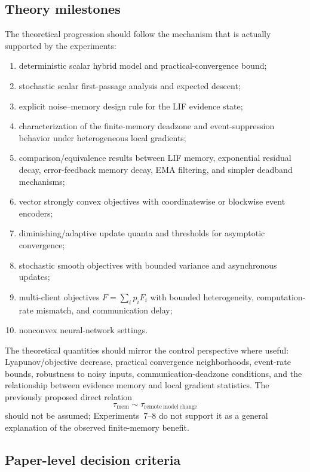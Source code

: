 \subsection{Theory milestones}

The theoretical progression should follow the mechanism that is actually supported by the experiments:
\begin{enumerate}
  \item deterministic scalar hybrid model and practical-convergence bound;
  \item stochastic scalar first-passage analysis and expected descent;
  \item explicit noise--memory design rule for the LIF evidence state;
  \item characterization of the finite-memory deadzone and event-suppression behavior under heterogeneous local gradients;
  \item comparison/equivalence results between LIF memory, exponential residual decay, error-feedback memory decay, EMA filtering, and simpler deadband mechanisms;
  \item vector strongly convex objectives with coordinatewise or blockwise event encoders;
  \item diminishing/adaptive update quanta and thresholds for asymptotic convergence;
  \item stochastic smooth objectives with bounded variance and asynchronous updates;
  \item multi-client objectives $F=\sum_i p_iF_i$ with bounded heterogeneity, computation-rate mismatch, and communication delay;
  \item nonconvex neural-network settings.
\end{enumerate}

The theoretical quantities should mirror the control perspective where useful: Lyapunov/objective decrease, practical convergence neighborhoods, event-rate bounds, robustness to noisy inputs, communication-deadzone conditions, and the relationship between evidence memory and local gradient statistics. The previously proposed direct relation
\begin{equation}
  \tau_{\mathrm{mem}}\sim\tau_{\mathrm{remote\ model\ change}}
\end{equation}
should not be assumed; Experiments~7--8 do not support it as a general explanation of the observed finite-memory benefit.

\subsection{Paper-level decision criteria}

